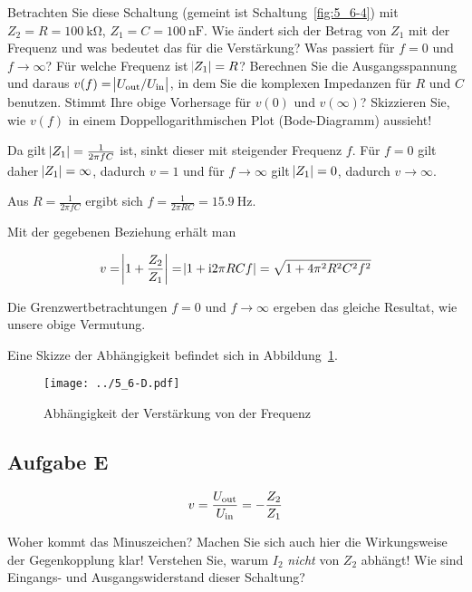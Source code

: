 \begin{problem}
    Betrachten Sie diese Schaltung (gemeint ist Schaltung~\ref{fig:5_6-4}) mit
    $Z_2 = R = \SI {100}{\kilo\ohm}$, $Z_1 = C = \SI {100}{\nano\farad}$. Wie
    ändert sich der Betrag von $Z_1$ mit der Frequenz und was bedeutet das für
    die Verstärkung? Was passiert für $f = 0$ und $f \to \infty$? Für welche
    Frequenz ist $\abs{Z_1} = R$? Berechnen Sie die Ausgangsspannung und
    daraus $v(f) = \abs{U_\text{out} / U_\text{in}}$, in dem Sie die komplexen Impedanzen für
    $R$ und $C$ benutzen. Stimmt Ihre obige Vorhersage für $v(0)$ und
    $v(\infty)$? Skizzieren Sie, wie $v(f)$ in einem Doppellogarithmischen Plot
    (Bode-Diagramm) aussieht!
\end{problem}

Da gilt $\abs{Z_1}=\frac 1{2\pi fC}$ ist, sinkt dieser mit steigender Frequenz
$f$. Für $f = 0$ gilt daher $\abs{Z_1} = \infty$, dadurch $v = 1$ und für $f
\to \infty$ gilt $\abs{Z_1} = 0$, dadurch $v \to \infty$.

Aus $R = \frac 1{2\pi fC}$ ergibt sich $f = \frac 1{2\pi RC} =
\SI{15.9}{\hertz}$.

Mit der gegebenen Beziehung erhält man

\[
    v = \abs{1 + \frac {Z_2}{Z_1}} = \abs{1 + \mathrm i 2\pi RC f} = \sqrt{1 +
    4\pi^2R^2C^2 f^2} 
\]

Die Grenzwertbetrachtungen $f = 0$ und $f \to \infty$ ergeben das gleiche
Resultat, wie unsere obige Vermutung.

Eine Skizze der Abhängigkeit befindet sich in Abbildung~\ref{fig:5_6-D}.

\begin{figure}[htbp]
    \centering
    \texttt{[image: ../5\_6-D.pdf]}
    \caption{%
        Abhängigkeit der Verstärkung von der Frequenz
    }
    \label{fig:5_6-D}
\end{figure}

\FloatBarrier
\subsection{Aufgabe E}

\begin{problem}
	\[
		v = \frac{U_\text{out}}{U_\text{in}} = - \frac{Z_2}{Z_1}
	\]

	Woher kommt das Minuszeichen? Machen Sie sich auch hier die Wirkungsweise
	der Gegenkopplung klar! Verstehen Sie, warum $I_2$ \emph{nicht} von $Z_2$
	abhängt! Wie sind Eingangs- und Ausgangswiderstand dieser Schaltung?
\end{problem}

